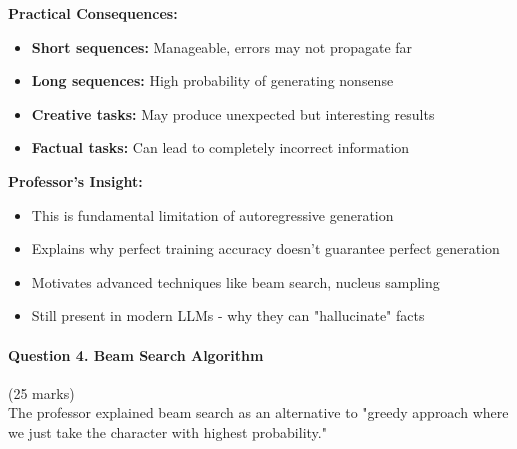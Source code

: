 \documentclass[12pt]{article}
\begin{document}
\begin{enumerate}[(a)]
{    \textbf{Practical Consequences:}
    \begin{itemize}
        \item \textbf{Short sequences:} Manageable, errors may not propagate far
        \item \textbf{Long sequences:} High probability of generating nonsense
        \item \textbf{Creative tasks:} May produce unexpected but interesting results
        \item \textbf{Factual tasks:} Can lead to completely incorrect information
    \end{itemize}
    
    \textbf{Professor's Insight:}
    \begin{itemize}
        \item This is fundamental limitation of autoregressive generation
        \item Explains why perfect training accuracy doesn't guarantee perfect generation
        \item Motivates advanced techniques like beam search, nucleus sampling
        \item Still present in modern LLMs - why they can "hallucinate" facts
    \end{itemize}
    }
\end{enumerate}

\newpage
\paragraph{Question 4. Beam Search Algorithm}\hfill (25 marks)\\
The professor explained beam search as an alternative to "greedy approach where we just take the character with highest probability."
\end{document}
